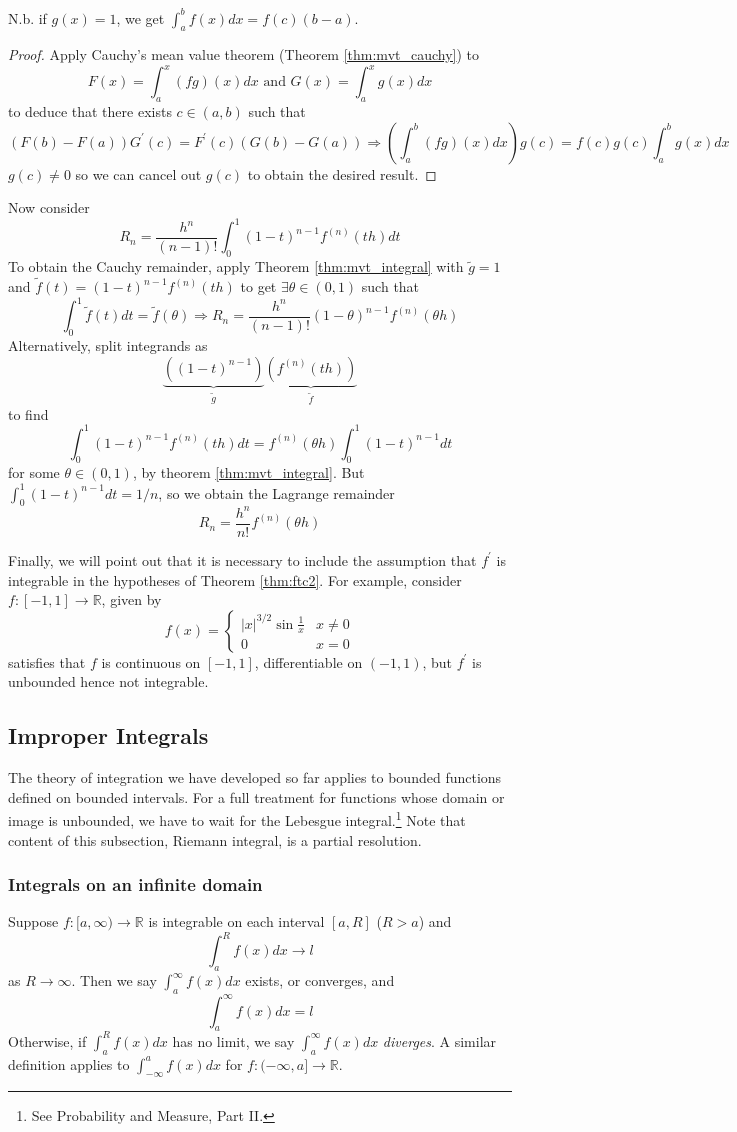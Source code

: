 \documentclass[10pt, a4paper, twoside]{report}
\begin{document}
N.b. if \(g(x)=1\), we get \(\int_a^bf(x)dx=f(c)(b-a)\).
\begin{proof}
    Apply Cauchy's mean value theorem (Theorem \ref{thm:mvt_cauchy}) to
    \[F(x)=\int_a^x(fg)(x)dx\text{  and  }G(x)=\int_a^xg(x)dx\]
    to deduce that there exists \(c\in(a,b)\) such that 
    \[(F(b)-F(a))G^\prime(c)=F^\prime(c)(G(b)-G(a))\Rightarrow\left(\int_a^b(fg)(x)dx\right)g(c)=f(c)g(c)\int_a^bg(x)dx\]
    \(g(c)\neq 0\) so we can cancel out \(g(c)\) to obtain the desired result.
\end{proof}
Now consider 
\[R_n=\frac{h^n}{(n-1)!}\int_0^1(1-t)^{n-1}f^{(n)}(th)dt\] 
To obtain the Cauchy remainder, apply Theorem \ref{thm:mvt_integral} with \(\tilde{g}=1\) and \(\tilde{f}(t)=(1-t)^{n-1}f^{(n)}(th)\) to get \(\exists\theta\in(0,1)\) such that 
\[\int_0^1\tilde{f}(t)dt=\tilde{f}(\theta)\Rightarrow R_n=\frac{h^n}{(n-1)!}(1-\theta)^{n-1}f^{(n)}(\theta h)\]
Alternatively, split integrands as 
\[\underbrace{\left((1-t)^{n-1}\right)}_{\tilde{g}}\underbrace{\left(f^{(n)}(th)\right)}_{\tilde{f}}\] to find
\[\int_0^1(1-t)^{n-1}f^{(n)}(th)dt=f^{(n)}(\theta h)\int_0^1(1-t)^{n-1}dt\]
for some \(\theta\in(0,1)\), by theorem \ref{thm:mvt_integral}. But \(\int_0^1(1-t)^{n-1}dt=1/n\), so we obtain the Lagrange remainder
\[R_n=\frac{h^n}{n!}f^{(n)}(\theta h)\]

Finally, we will point out that it is necessary to include the assumption that \(f^\prime\) is integrable in the hypotheses of Theorem \ref{thm:ftc2}. For example, consider \(f:[-1,1]\to\mathbb{R}\), given by 
\[f(x)=\begin{cases}
    |x|^{3/2}\sin\frac 1x & x\neq 0 \\
    0 & x=0
\end{cases}\]
satisfies that \(f\) is continuous on \([-1,1]\), differentiable on \((-1,1)\), but \(f^\prime\) is unbounded hence not integrable.
\subsection{Improper Integrals}
The theory of integration we have developed so far applies to bounded functions defined on bounded intervals. For a full treatment for functions whose domain or image is unbounded, we have to wait for the Lebesgue integral.\footnote{See Probability and Measure, Part II.} Note that content of this subsection, Riemann integral, is a partial resolution.
\subsubsection{Integrals on an infinite domain}
Suppose \(f:[a,\infty)\to\mathbb{R}\) is integrable on each interval \([a,R]\) (\(R>a\)) and 
\[\int_a^Rf(x)dx\to l\]
as \(R\to\infty\). Then we say 
\(\int_a^\infty f(x)dx\)
exists, or converges, and 
\[\int_a^\infty f(x)dx=l\] 
Otherwise, if \(\int_a^Rf(x)dx\) has no limit, we say \(\int_a^\infty f(x)dx\) \emph{diverges}. A similar definition applies to \(\int_{-\infty}^{a}f(x)dx\) for \(f:(-\infty,a]\to\mathbb{R}\). 
\end{document}
